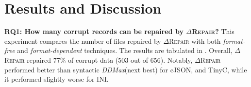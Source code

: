 \documentclass[acmsmall,screen,review,anonymous]{acmart}
\newcommand{\formatfree}{format-free\xspace}
\newcommand{\formatdependent}{format-dependent\xspace}
\newcommand{\dtask}{data repair\xspace}
\newcommand{\approach}{\textsc{$\Delta$Repair}\xspace}
\newcommand{\ddmax}{\textit{DDMax}\xspace}
\newcommand{\drepair}{\approach}
\begin{document}
\section{Results and Discussion}
\label{sec:discussion}
\noindent\textbf{RQ1: How many corrupt records can be repaired by \drepair?}
This experiment compares the number of files repaired by \drepair with both
\emph{\formatfree} and \emph{\formatdependent}
techniques. The results are tabulated in .
Overall, \drepair repaired 77\% of corrupt data (503 out of 656).
Notably, \drepair performed better than syntactic \ddmax (next best)
for cJSON, and TinyC, while it performed slightly worse for INI.

%
\end{document}
